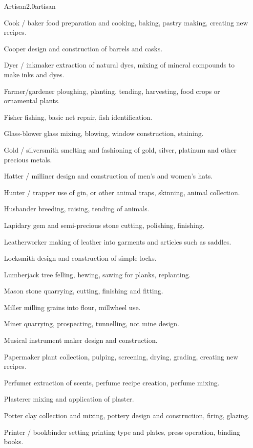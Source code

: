 \begin{skill}{Artisan}{2.0}{artisan}
\begin{Description}
\item[Cook / baker] food preparation and cooking, baking, pastry making, creating new recipes.
\item[Cooper] design and construction of barrels and casks.
\item[Dyer / inkmaker] extraction of natural dyes, mixing of mineral compounds to make inks and dyes.
\item[Farmer/gardener] ploughing, planting, tending, harvesting, food crops or ornamental plants.
\item[Fisher] fishing, basic net repair, fish identification.
\item[Glass-blower] glass mixing, blowing, window construction, staining.
\item[Gold / silversmith] smelting and fashioning of gold, silver, platinum and other precious metals.
\item[Hatter / milliner] design and construction of men's and women's hats.
\item[Hunter / trapper] use of gin, or other animal traps, skinning, animal collection.
\item[Husbander] breeding, raising, tending of animals.
\item[Lapidary] gem and semi-precious stone cutting, polishing, finishing.
\item[Leatherworker] making of leather into garments and articles such as saddles.
\item[Locksmith] design and construction of simple locks.
\item[Lumberjack] tree felling, hewing, sawing for planks, replanting.
\item[Mason] stone quarrying, cutting, finishing and fitting.
\item[Miller] milling grains into flour, millwheel use.
\item[Miner] quarrying, prospecting, tunnelling, not mine design.
\item[Musical instrument maker] design and construction.
\item[Papermaker] plant collection, pulping, screening, drying, grading, creating new recipes.
\item[Perfumer] extraction of scents, perfume recipe creation, perfume mixing.
\item[Plasterer] mixing and application of plaster.
\item[Potter] clay collection and mixing, pottery design and construction, firing, glazing.
\item[Printer / bookbinder] setting printing type and plates, press operation, binding books.

\end{Description}
\end{skill}
